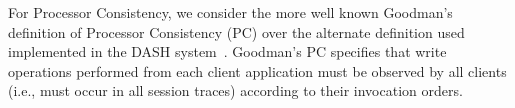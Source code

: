 \documentclass[journal,compsoc]{IEEEtran}
\begin{document}
For Processor Consistency, we consider the more 
  well known Goodman's definition of Processor Consistency (PC) over the alternate definition used implemented in the DASH system~\cite{Ahamad:1993:PPC:165231.165264}. Goodman's PC specifies that write operations performed from each client application must be observed by all clients (i.e., must occur in all  session traces) according to their invocation orders. %
\end{document}
